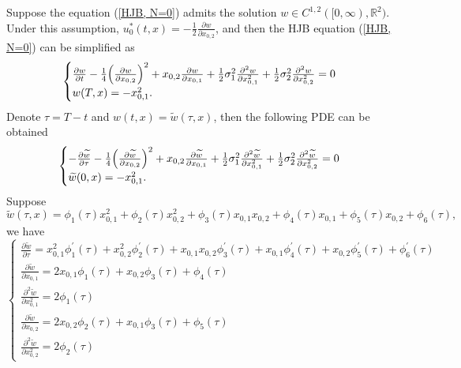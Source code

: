 \documentclass{article}
\begin{document}
Suppose the equation (\ref{HJB, N=0}) admits the solution $w \in C^{1, 2}([0, \infty), \mathbb{R}^{2})$. Under this assumption, $u_{0}^{*}(t, x) = - \frac{1}{2} \frac{\partial w}{\partial x_{0, 2}}$, and then the HJB equation (\ref{HJB, N=0}) can be simplified as
\begin{equation*} 
    \begin{cases}
   \frac{\partial w}{\partial t} -  \frac{1}{4} \Big{(} \frac{\partial w}{\partial x_{0, 2}} \Big{)}^{2} + x_{0,2} \frac{\partial w}{\partial x_{0, 1}}  + \frac{1}{2} \sigma_{1}^{2} \frac{\partial^{2} w}{\partial x_{0, 1}^{2}} + \frac{1}{2} \sigma_{2}^{2} \frac{\partial^{2} w}{\partial x_{0, 2}^{2}} = 0  \\
   w(T, x) = - x_{0, 1}^{2}.
   \end{cases}
\end{equation*}
Denote $\tau = T-t$ and $w(t, x) = \widetilde{w}(\tau, x)$, then the following PDE can be obtained
\begin{equation*}
    \begin{cases}
   - \frac{\partial \widetilde{w}}{\partial \tau} -  \frac{1}{4} \Big{(} \frac{\partial \widetilde{w}}{\partial x_{0, 2}} \Big{)}^{2} + x_{0,2} \frac{\partial \widetilde{w}}{\partial x_{0, 1}}  + \frac{1}{2} \sigma_{1}^{2} \frac{\partial^{2} \widetilde{w}}{\partial x_{0, 1}^{2}} + \frac{1}{2} \sigma_{2}^{2} \frac{\partial^{2} \widetilde{w}}{\partial x_{0, 2}^{2}} = 0  \\
   \widetilde{w}(0, x) = - x_{0, 1}^{2}.
   \end{cases}
\end{equation*}
Suppose 
\begin{equation}
    \widetilde{w}(\tau, x) = \phi_{1}(\tau) x_{0, 1}^{2} + \phi_{2}(\tau) x_{0, 2}^{2} + \phi_{3}(\tau) x_{0, 1} x_{0, 2} + \phi_{4}(\tau) x_{0, 1} + \phi_{5}(\tau) x_{0, 2} + \phi_{6} (\tau),
\end{equation}
we have
\begin{equation*}
    \begin{cases}
   \frac{\partial \widetilde{w}}{\partial \tau} = x_{0, 1}^{2} \phi_{1}^{'} (\tau) + x_{0, 2}^{2} \phi_{2}^{'} (\tau) + x_{0, 1} x_{0, 2} \phi_{3}^{'} (\tau) + x_{0, 1} \phi_{4}^{'} (\tau) + x_{0, 2} \phi_{5}^{'} (\tau) + \phi_{6}^{'} (\tau) \\
   \frac{\partial \widetilde{w}}{\partial x_{0, 1}} = 2 x_{0, 1} \phi_{1} (\tau) + x_{0, 2} \phi_{3}(\tau) + \phi_{4}(\tau) \\
   \frac{\partial^{2} \widetilde{w}}{\partial x_{0, 1}^{2}} = 2 \phi_{1}(\tau) \\
   \frac{\partial \widetilde{w}}{\partial x_{0, 2}} = 2 x_{0, 2} \phi_{2} (\tau) + x_{0, 1} \phi_{3}(\tau) + \phi_{5}(\tau) \\
   \frac{\partial^{2} \widetilde{w}}{\partial x_{0, 2}^{2}} = 2 \phi_{2}(\tau)
   \end{cases}
\end{equation*}
\end{document}
